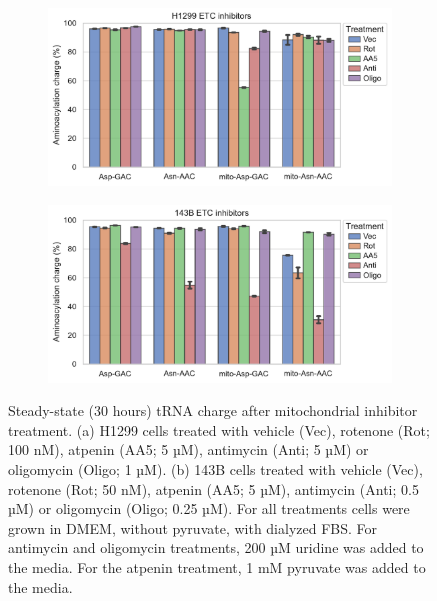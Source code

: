 \begin{figure}[!ht]
     \centering
     \begin{subfigure}[b]{0.6\textwidth}
         \includegraphics[width=\textwidth]{figures/chap2/H1299_ETCinhib_Asp-Asn.pdf}
     \end{subfigure}
     \begin{subfigure}[b]{0.6\textwidth}
         \vspace{5pt}
         \includegraphics[width=\textwidth]{figures/chap2/143B_ETCinhib_Asp-Asn.pdf}
     \end{subfigure}
     \hfill
        \caption[ETC inhibitor in H1299/143B, effect on tRNA charge.]{
        Steady-state (30 hours) tRNA charge after mitochondrial inhibitor treatment.
        (a) H1299 cells treated with vehicle (Vec), rotenone (Rot; 100 nM), atpenin (AA5; 5 µM), antimycin (Anti; 5 µM) or oligomycin (Oligo; 1 µM).
        (b) 143B cells treated with vehicle (Vec), rotenone (Rot; 50 nM), atpenin (AA5; 5 µM), antimycin (Anti; 0.5 µM) or oligomycin (Oligo; 0.25 µM).
        For all treatments cells were grown in DMEM, without pyruvate, with dialyzed FBS.
        For antimycin and oligomycin treatments, 200 µM uridine was added to the media.
        For the atpenin treatment, 1 mM pyruvate was added to the media.
        }
        \label{fig:ch2:tRNA:H1299_143B_ETCinhib}
\end{figure}




